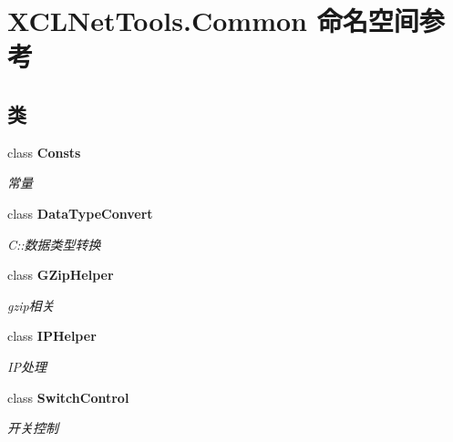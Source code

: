 \hypertarget{namespace_x_c_l_net_tools_1_1_common}{}\section{X\+C\+L\+Net\+Tools.\+Common 命名空间参考}
\label{namespace_x_c_l_net_tools_1_1_common}
\subsection*{类}
\begin{DoxyCompactItemize}
\item 
class {\bfseries Consts}
\begin{DoxyCompactList}\small\item\em 常量 \end{DoxyCompactList}\item 
class {\bfseries Data\+Type\+Convert}
\begin{DoxyCompactList}\small\item\em C\+::数据类型转换 \end{DoxyCompactList}\item 
class {\bfseries G\+Zip\+Helper}
\begin{DoxyCompactList}\small\item\em gzip相关 \end{DoxyCompactList}\item 
class {\bfseries I\+P\+Helper}
\begin{DoxyCompactList}\small\item\em I\+P处理 \end{DoxyCompactList}\item 
class {\bfseries Switch\+Control}
\begin{DoxyCompactList}\small\item\em 开关控制 \end{DoxyCompactList}\end{DoxyCompactItemize}
